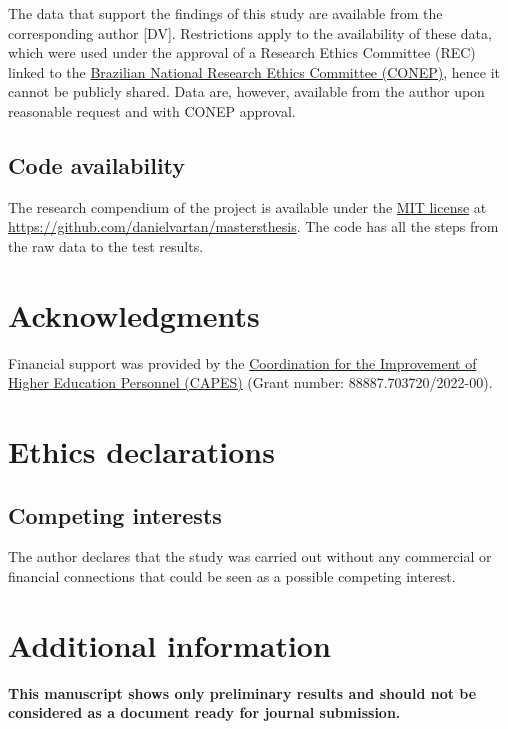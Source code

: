 \documentclass[
12pt,
openright,
oneside,
a4paper,
chapter=TITLE,
section=TITLE,
french,
spanish,
brazil,
english
]{abntex2}\usepackage{array}
\begin{document}
The data that support the findings of this study are available from the
corresponding author {[}DV{]}. Restrictions apply to the availability of
these data, which were used under the approval of a Research Ethics
Committee (REC) linked to the
\href{https://conselho.saude.gov.br/Web_comissoes/conep/index.html}{Brazilian
National Research Ethics Committee (CONEP)}, hence it cannot be publicly
shared. Data are, however, available from the author upon reasonable
request and with CONEP approval.

\subsection{Code availability}\label{code-availability}

The research compendium of the project is available under the
\href{https://opensource.org/license/mit/}{MIT license} at
\url{https://github.com/danielvartan/mastersthesis}. The code has all
the steps from the raw data to the test results.

\section{Acknowledgments}\label{acknowledgments}

Financial support was provided by the
\href{https://www.gov.br/capes/}{Coordination for the Improvement of
Higher Education Personnel (CAPES)} (Grant number:
88887.703720/2022-00).

\section{Ethics declarations}\label{ethics-declarations}

\subsection{Competing interests}\label{competing-interests}

The author declares that the study was carried out without any
commercial or financial connections that could be seen as a possible
competing interest.

\section{Additional information}\label{additional-information}

\textbf{This manuscript shows only preliminary results and should not be
considered as a document ready for journal submission.}
\end{document}
